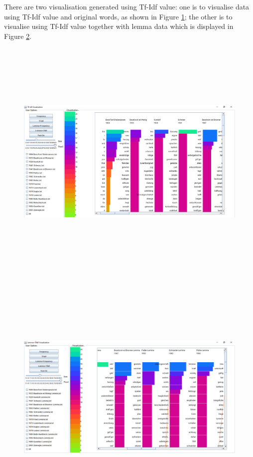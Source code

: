 There are two visualisation generated using Tf-Idf value: one is to visualise data using Tf-Idf value and original words, as shown in Figure \ref{fig:tfIdfView}; the other is to visualise using Tf-Idf value together with lemma data which is displayed in Figure \ref{fig:tfIdfLemma}.

\begin{figure}[H]
	\centering	
	\includegraphics[width=16cm, height=12cm]{Figs/Tf-Idf}\\[1ex]
	\caption{}
	\label{fig:tfIdfView}
\end{figure} 
\begin{figure}[H]
	\centering	
	\includegraphics[width=16cm, height=12cm]{Figs/Lemma-TfIdf}\\[1ex]
	\caption{}
	\label{fig:tfIdfLemma}
\end{figure} 


